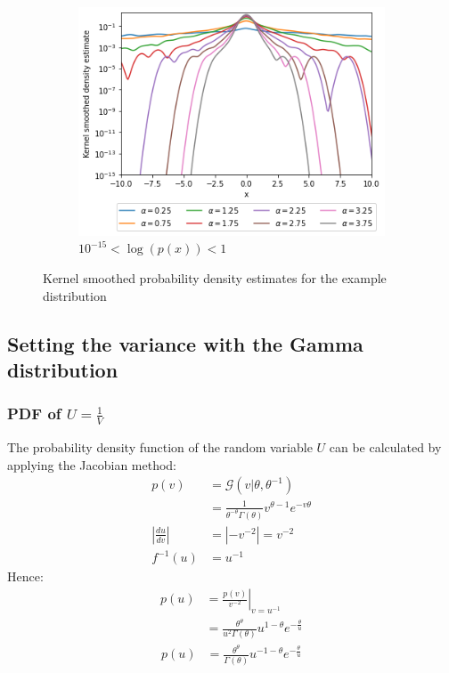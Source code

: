 \documentclass[a4paper]{article}
\begin{document}
\begin{figure}[h]
\begin{subfigure}[b]{0.3\textwidth}
    \end{subfigure}
    \hfill
    \begin{subfigure}[b]{0.3\textwidth}
        \centering
        \includegraphics[width=\textwidth]{figures/nonstandard_distribution_ksdensity_log_far.png}
        \caption{$10^{-15} < \log(p(x)) < 1$}
        \label{fig:nonstandard_distribution_ksdensity_log_far}
    \end{subfigure}
    \caption{Kernel smoothed probability density estimates for the example distribution}
    \label{fig:nonstandard_distribution_kernel_smoothed}
\end{figure}


\subsection{Setting the variance with the Gamma distribution}
\subsubsection{PDF of $U=\frac{1}{V}$}
The probability density function of the random variable $U$ can be calculated by applying the Jacobian method:
\begin{align*}
     p(v) &= \mathcal{G}(v | \theta, \theta^{-1}) \\
    &= \frac{1}{\theta^{-\theta} \Gamma (\theta)} v^{\theta - 1} e^{-v \theta} \\
    \left| \frac{du}{dv} \right| &= \left| -v^{-2} \right| = v^{-2} \\
    f^{-1} (u) &= u^{-1}
\end{align*}
Hence:
\begin{align*}
    p(u) &= \left. \frac{p(v)}{v^{-2}} \right|_{v=u^{-1}} \\
    &= \frac{\theta^{\theta}}{u^2 \Gamma(\theta)} u^{1-\theta} e^{-\frac{\theta}{u}}
\end{align*}
\begin{align}\label{eq:pdf_of_u}
    p(u) &= \frac{\theta^{\theta}}{\Gamma(\theta)} u^{-1-\theta} e^{-\frac{\theta}{u}}
\end{align}
\end{document}
